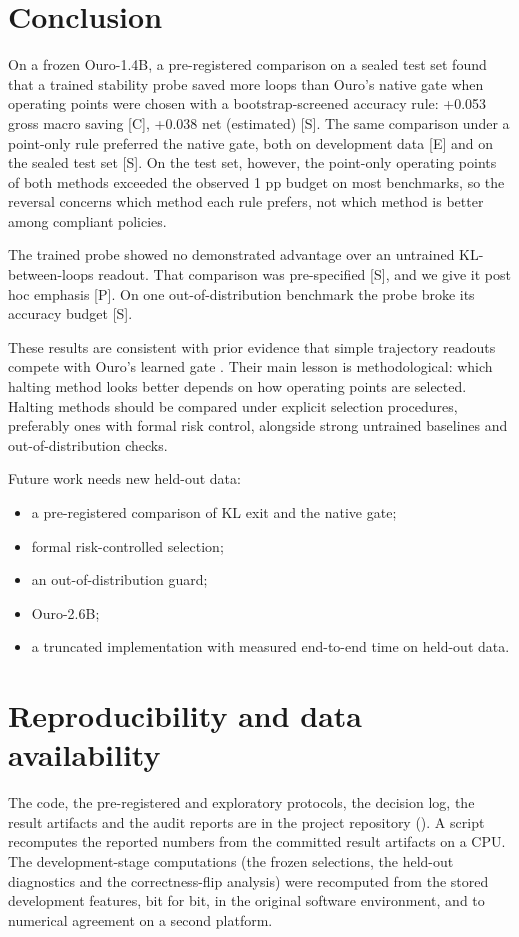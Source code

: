 \section{Conclusion}

On a frozen Ouro-1.4B, a pre-registered comparison on a sealed test set found that a trained stability probe saved more loops than Ouro's
native gate when operating points were chosen with a bootstrap-screened accuracy rule: +0.053 gross macro saving {[}C{]}, +0.038 net (estimated) {[}S{]}.
The same comparison under a point-only rule preferred the native gate, both on development data {[}E{]} and on the sealed test set {[}S{]}. On the test set,
however, the point-only operating points of both methods exceeded the observed 1 pp budget on most benchmarks, so the reversal concerns which method each
rule prefers, not which method is better among compliant policies.

The trained probe showed no demonstrated advantage over an untrained KL-between-loops readout. That comparison was pre-specified {[}S{]}, and we
give it post hoc emphasis {[}P{]}. On one out-of-distribution benchmark the probe broke its accuracy budget {[}S{]}.

These results are consistent with prior evidence that simple trajectory readouts compete with Ouro's learned gate \citep{Popescu2026}. Their main
lesson is methodological: which halting method looks better depends on how operating points are selected. Halting methods should be compared
under explicit selection procedures, preferably ones with formal risk control, alongside strong untrained baselines and out-of-distribution
checks.

Future work needs new held-out data:

\begin{itemize}
\tightlist
\item
  a pre-registered comparison of KL exit and the native gate;
\item
  formal risk-controlled selection;
\item
  an out-of-distribution guard;
\item
  Ouro-2.6B;
\item
  a truncated implementation with measured end-to-end time on held-out data.
\end{itemize}

\section*{Reproducibility and data availability}
The code, the pre-registered and exploratory protocols, the decision log, the result artifacts and the audit reports are in the project repository (\codeavailability). A script recomputes the reported numbers from the committed result artifacts on a CPU. The development-stage computations (the frozen selections, the held-out diagnostics and the correctness-flip analysis) were recomputed from the stored development features, bit for bit, in the original software environment, and to numerical agreement on a second platform.

